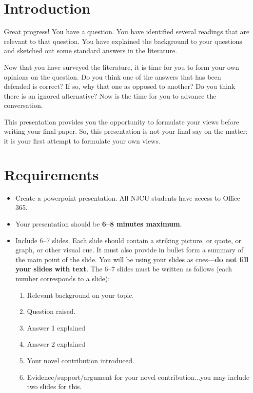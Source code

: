 \documentclass[oneside]{article}
\begin{document}
\section*{Introduction}\label{introduction}

Great progress! You have a question. You have identified several
readings that are relevant to that question. You have explained the
background to your questions and sketched out some standard answers in
the literature. 

Now that you have surveyed the literature, it is time for you to form
your own opinions on the question. Do you think one of the answers that
has been defended is correct? If so, why that one as opposed to another?
Do you think there is an ignored alternative? Now is the time for you to
advance the conversation.

This presentation provides you the opportunity to formulate your views
before writing your final paper. So, this presentation is not your final say on the matter; it is your first attempt to formulate your own views. 

\section*{Requirements}\label{requirements}

\begin{itemize}
\item Create a powerpoint presentation. All NJCU students have access to Office 365.  
\item Your presentation should be \textbf{6--8 minutes maximum}.
\item Include 6--7 slides. Each slide should contain a striking picture, or quote,
or graph, or other visual cue. It must also provide in bullet form a
summary of the main point of the slide. You will be using your slides as
cues---\textbf{do not fill your slides with text}. The 6--7 slides must be
written as follows (each number corresponds to a slide):

\begin{enumerate}
\item
  Relevant background on your topic.
\item
  Question raised.
\item
  Answer 1 explained
\item
  Answer 2 explained
\item
  Your novel contribution introduced.
\item
  Evidence/support/argument for your novel contribution...you may include two slides for this.

\end{enumerate}
\end{itemize}
\end{document}
